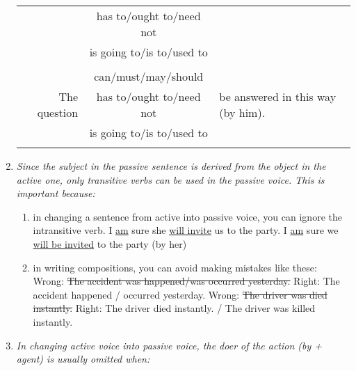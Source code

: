 \begin{enumerate}
\begin{tabular}{rcl}
            & has to/ought to/need not & \\
            & is going to/is to/used to & \\ \\
            \multirow{3}{*}{The question}
            & can/must/may/should &
            \multirow{3}{*}{be answered in this way (by him).} \\
            & has to/ought to/need not & \\
            & is going to/is to/used to & \\ \\
        \end{tabular}
    \item
        {\it
        Since the subject in the passive sentence is derived from the object in
        the active one, only transitive verbs can be used in the passive voice.
        This is important because:
        }
        \begin{enumerate}
            \item in changing a sentence from active into passive voice, you can
                ignore the intransitive verb.
                \newline
                \newline
                I \underline{am} sure she \underline{will invite} us to the party.
                \newline
                I \underline{am} sure we \underline{will be invited} to the party (by her)
            \item in writing compositions, you can avoid making mistakes like
                these:
                \newline
                \newline
                Wrong: \st{The accident was happened/was occurred yesterday.}
                \newline
                Right: The accident happened / occurred yesterday.
                \newline
                \newline
                Wrong: \st{The driver was died instantly.}
                \newline
                Right: The driver died instantly. / The driver was killed
                instantly.
        \end{enumerate}
    \item
        {\it
        In changing active voice into passive voice, the doer of the action (by
        + agent) is usually omitted when:
}
\end{enumerate}
